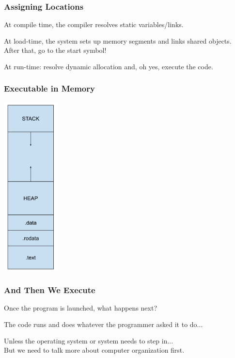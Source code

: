 \begin{frame}
\frametitle{Assigning Locations}

At compile time, the compiler resolves static variables/links.

At load-time, the system sets up memory segments and links shared objects.\\
\quad After that, go to the start symbol!

At run-time: resolve dynamic allocation and, oh yes, execute the code.

\end{frame}

\begin{frame}
\frametitle{Executable in Memory}

\begin{center}
  \includegraphics[width=0.22\textwidth]{images/program-in-mem.png}
\end{center}

\end{frame}

\begin{frame}
\frametitle{And Then We Execute}

Once the program is launched, what happens next?

The code runs and does whatever the programmer asked it to do...

Unless the operating system or system needs to step in...\\
\quad But we need to talk more about computer organization first.

\end{frame}



